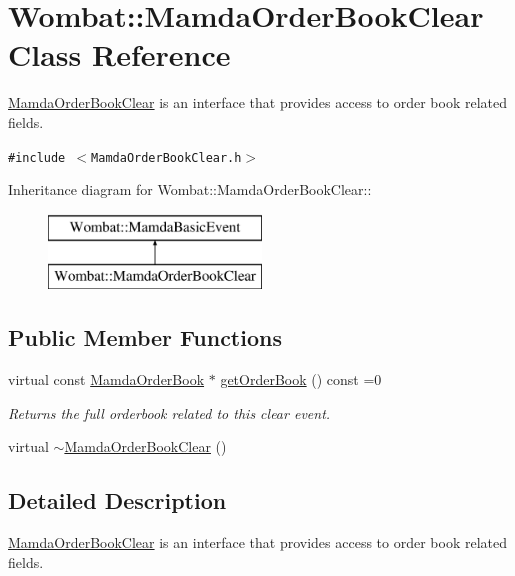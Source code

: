 \hypertarget{classWombat_1_1MamdaOrderBookClear}{
\section{Wombat::Mamda\-Order\-Book\-Clear Class Reference}
\label{classWombat_1_1MamdaOrderBookClear}
}
\hyperlink{classWombat_1_1MamdaOrderBookClear}{Mamda\-Order\-Book\-Clear} is an interface that provides access to order book related fields.  


{\tt \#include $<$Mamda\-Order\-Book\-Clear.h$>$}

Inheritance diagram for Wombat::Mamda\-Order\-Book\-Clear::\begin{figure}[H]
\begin{center}
\leavevmode
\includegraphics[height=2cm]{classWombat_1_1MamdaOrderBookClear}
\end{center}
\end{figure}
\subsection*{Public Member Functions}
\begin{CompactItemize}
\item 
virtual const \hyperlink{classWombat_1_1MamdaOrderBook}{Mamda\-Order\-Book} $\ast$ \hyperlink{classWombat_1_1MamdaOrderBookClear_af2cd011b83b28f26b4d9e8a7e184952}{get\-Order\-Book} () const =0
\begin{CompactList}\small\item\em Returns the full orderbook related to this clear event. \item\end{CompactList}\item 
virtual \hyperlink{classWombat_1_1MamdaOrderBookClear_39182ff875e6cc643c31948cf5a97f31}{$\sim$Mamda\-Order\-Book\-Clear} ()
\end{CompactItemize}


\subsection{Detailed Description}
\hyperlink{classWombat_1_1MamdaOrderBookClear}{Mamda\-Order\-Book\-Clear} is an interface that provides access to order book related fields. 



